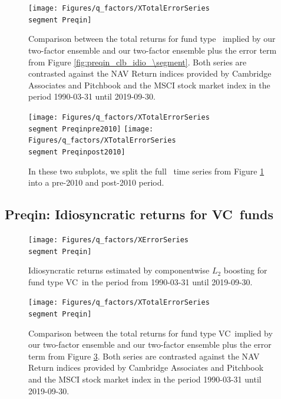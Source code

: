 \begin{figure}[H]
	\centering
	\texttt{[image: Figures/q\_factors/XTotalErrorSeries\\segment Preqin]}
	\caption{
		Comparison between the total returns for fund type \segment \ implied by our two-factor ensemble and our two-factor ensemble plus the error term from Figure \ref{fig:preqin_clb_idio_\segment}.
		Both series are contrasted against the NAV Return indices provided by Cambridge Associates and Pitchbook and the MSCI stock market index in the period 1990-03-31 until 2019-09-30.
	}
	\label{fig:preqin_clb_total_\segment}
\end{figure}

\begin{figure}[H]
	\centering
	\texttt{[image: Figures/q\_factors/XTotalErrorSeries\\segment Preqinpre2010]}
	\texttt{[image: Figures/q\_factors/XTotalErrorSeries\\segment Preqinpost2010]}
	\caption{
		In these two subplots, we split the full \segment \ time series from Figure \ref{fig:preqin_clb_total_\segment} into a pre-2010 and post-2010 period.
	}
	\label{fig:preqin_clb_pre_post_2010_\segment}
\end{figure}


\renewcommand{\segment}{VC}

\subsection{Preqin: Idiosyncratic returns for \segment \ funds}
\label{sec:preqin_errors_\segment}

\begin{figure}[H]
	\centering
	\texttt{[image: Figures/q\_factors/XErrorSeries\\segment Preqin]}
	\caption{Idiosyncratic returns estimated by componentwise $L_2$ boosting for fund type \segment \ in the period from 1990-03-31 until 2019-09-30.}
	\label{fig:preqin_clb_idio_\segment}
\end{figure}

\begin{figure}[H]
	\centering
	\texttt{[image: Figures/q\_factors/XTotalErrorSeries\\segment Preqin]}
	\caption{
		Comparison between the total returns for fund type \segment \ implied by our two-factor ensemble and our two-factor ensemble plus the error term from Figure \ref{fig:preqin_clb_idio_\segment}.
		Both series are contrasted against the NAV Return indices provided by Cambridge Associates and Pitchbook and the MSCI stock market index in the period 1990-03-31 until 2019-09-30.
	}
	\label{fig:preqin_clb_total_\segment}
\end{figure}

